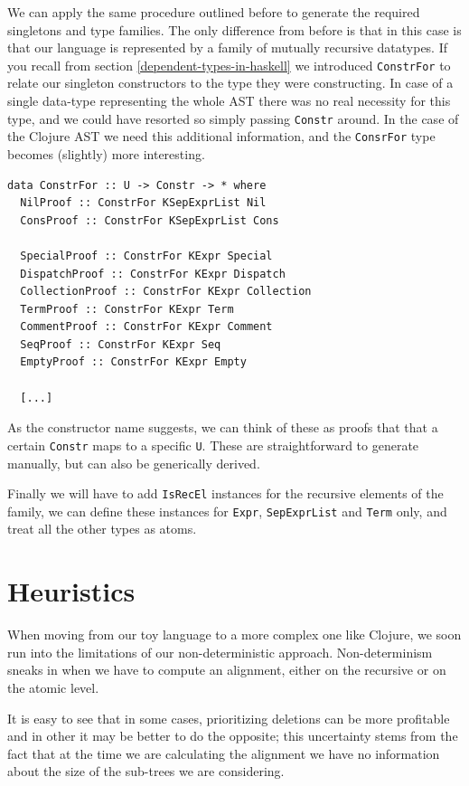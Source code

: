 \documentclass[11pt, titlepage]{article}
\newcommand{\toHaskell}[1]{\texttt{#1}\xspace}
\begin{document}
We can apply the same procedure outlined before to generate the required singletons and type families. The only difference from before is that in this case is that our language is represented by a family of mutually recursive datatypes. If you recall from section \ref{dependent-types-in-haskell} we introduced \toHaskell{ConstrFor} to relate our singleton constructors to the type they were constructing. In case of a single data-type representing the whole AST there was no real necessity for this type, and we could have resorted so simply passing \toHaskell{Constr} around. In the case of the Clojure AST we need this additional information, and the \toHaskell{ConsrFor} type becomes (slightly) more interesting.

\begin{verbatim}
data ConstrFor :: U -> Constr -> * where
  NilProof :: ConstrFor KSepExprList Nil
  ConsProof :: ConstrFor KSepExprList Cons

  SpecialProof :: ConstrFor KExpr Special
  DispatchProof :: ConstrFor KExpr Dispatch
  CollectionProof :: ConstrFor KExpr Collection
  TermProof :: ConstrFor KExpr Term
  CommentProof :: ConstrFor KExpr Comment
  SeqProof :: ConstrFor KExpr Seq
  EmptyProof :: ConstrFor KExpr Empty
  
  [...]
\end{verbatim}

As the constructor name suggests, we can think of these as proofs that  that a certain \toHaskell{Constr} maps to a specific \toHaskell{U}. These are straightforward to generate manually, but can also be generically derived.

Finally we will have to add \toHaskell{IsRecEl} instances for the recursive elements of the family, we can define these instances for \toHaskell{Expr}, \toHaskell{SepExprList} and \toHaskell{Term} only, and treat all the other types as atoms.  



\section{Heuristics}

When moving from our toy language to a more complex one like Clojure, we soon run into the limitations of our non-deterministic approach.
Non-determinism sneaks in when we have to compute an alignment, either on the recursive or on the atomic level. 

It is easy to see that in some cases, prioritizing deletions can be more profitable and in other it may be better to do the opposite; this uncertainty stems from the fact that at the time we are calculating the alignment we have no information about the size of the sub-trees we are considering. 
\end{document}

